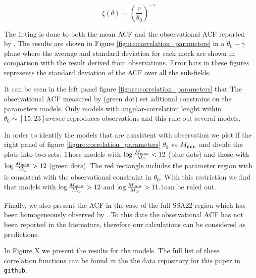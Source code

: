 \documentclass[usenatbib]{mn2e}
\begin{document}
\begin{equation}
\xi(\theta) = \left(\frac{r}{\theta_{0}}\right)^{-\gamma}
\end{equation}

The fitting is done to both the mean ACF and the observational
ACF reported by \cite{Hayashino2004} .  The results are shown 
in Figure  \ref{figure:correlation_parameters}  in a $\theta_{0}-\gamma$ 
plane where the average and standard deviation for each mock 
are shown in comparison with the result derived from observations. 
Error bars in these figures represents the standard deviation of the
ACF over all the sub-fields.  

It can be seen in the left panel figure \ref{figure:correlation_parameters} that
The observational ACF measured by \cite{Hayashino2004} (green dot) set aditional 
constrains on the parameters models. Only models with angular-correlation lenght within  
$\theta_{0}\sim[15,23]arcsec$ reproduces observations and this rule out several models. 

In order to identify the models that are consistent with observation we
plot if the right panel of figure \ref{figure:correlation_parameters} 
$\theta_{0}$ vs $M_{\rm min}$ and divide the plots into two sets: Those models
with $\log \frac{M_{\rm max}}{M_{\odot}}<12$ (blue dots) and those with 
$\log \frac{M_{\rm max}}{M_{\odot}}>12$ (green dots). The red rectangle includes
the parameter region wich is consistent with the observational constraint in $\theta_{0}$.
With this restriction we find that models with $\log \frac{M_{\rm max}}{M_{\odot}}>12$ and
$\log \frac{M_{\rm min}}{M_{\odot}}>11.1$can be ruled out.





Finally, we also present the ACF in the case of the full SSA22
region which has been homogeneously observed by \citep{Yamada2012}. To
this date the observational ACF has not been reported in the
litereature, therefore our calculations can be considered as
predictions. 

In Figure X we present the results for the models. The full list of
these correlation functions can be found in the the data repository
for this paper in \verb"github". 
\end{document}
